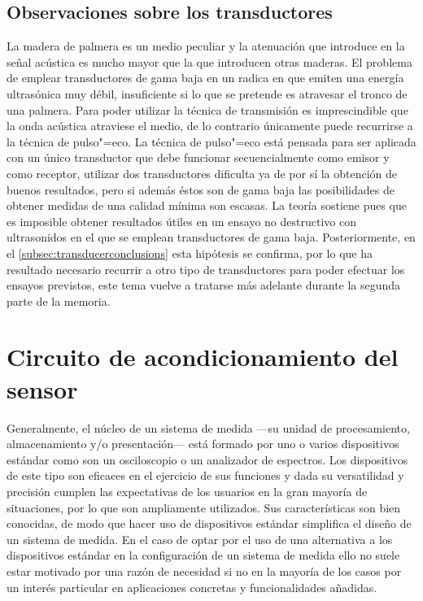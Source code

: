 \subsection{Observaciones sobre los transductores}

La madera de palmera es un medio peculiar y la atenuación que introduce en
la señal acústica es mucho mayor que la que introducen otras maderas. El
problema de emplear transductores de gama baja en un  radica en
que emiten una energía ultrasónica muy débil, insuficiente si lo que se
pretende es atravesar el tronco de una palmera. Para poder utilizar la
técnica de transmisión es imprescindible que la onda acústica atraviese el
medio, de lo contrario únicamente puede recurrirse a la técnica de
pulso"=eco. La técnica de pulso"=eco está pensada para ser aplicada con un
único transductor que debe funcionar secuencialmente como emisor y como
receptor, utilizar dos transductores dificulta ya de por sí la obtención de
buenos resultados, pero si además éstos son de gama baja las posibilidades
de obtener medidas de una calidad mínima son escasas. La teoría sostiene
pues que es imposible obtener resultados útiles en un ensayo no destructivo
con ultrasonidos en el que se emplean transductores de gama baja.
Posteriormente, en el \cref{subsec:transducerconclusions} esta hipótesis se
confirma, por lo que ha resultado necesario recurrir a otro tipo de
transductores para poder efectuar los ensayos previstos, este tema vuelve a
tratarse más adelante durante la segunda parte de la memoria.


\section{Circuito de acondicionamiento del sensor}\label{sec:rxco}

Generalmente, el núcleo de un sistema de medida ---su unidad de
procesamiento, almacenamiento y/o presentación--- está formado por uno o
varios dispositivos estándar como son un osciloscopio o un analizador de
espectros. Los dispositivos de este tipo son eficaces en el ejercicio de
sus funciones y dada su versatilidad y precisión cumplen las expectativas
de los usuarios en la gran mayoría de situaciones, por lo que son
ampliamente utilizados. Sus características son bien conocidas, de modo que
hacer uso de dispositivos estándar simplifica el diseño de un sistema de
medida. En el caso de optar por el uso de una alternativa a los
dispositivos estándar en la configuración de un sistema de medida ello no
suele estar motivado por una razón de necesidad si no en la mayoría de los
casos por un interés particular en aplicaciones concretas y funcionalidades
añadidas.

